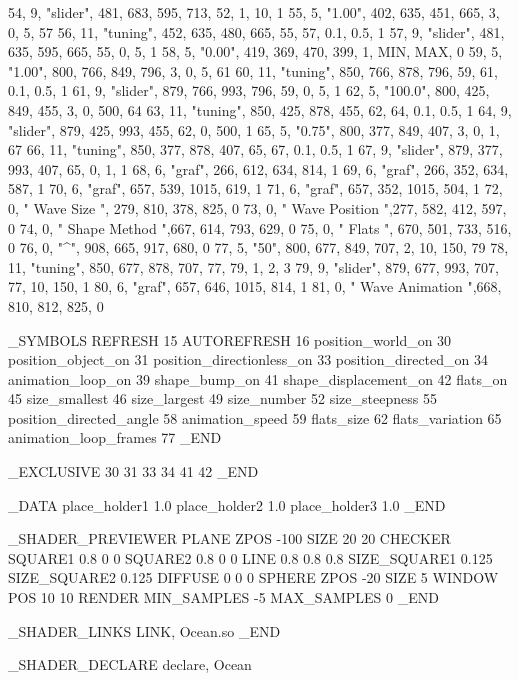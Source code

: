    54,	9,	"slider",	481, 683, 595, 713, 52, 1, 10, 1
   55,	5,	"1.00",		402, 635, 451, 665, 3, 0, 5, 57
   56,	11,	"tuning",	452, 635, 480, 665, 55, 57, 0.1, 0.5, 1
   57,	9,	"slider",	481, 635, 595, 665, 55, 0, 5, 1
   58,	5,	"0.00",		419, 369, 470, 399, 1, MIN, MAX, 0
   59,	5,	"1.00",		800, 766, 849, 796, 3, 0, 5, 61
   60,	11,	"tuning",	850, 766, 878, 796, 59, 61, 0.1, 0.5, 1
   61,	9,	"slider",	879, 766, 993, 796, 59, 0, 5, 1
   62,	5,	"100.0",	800, 425, 849, 455, 3, 0, 500, 64
   63,	11,	"tuning",	850, 425, 878, 455, 62, 64, 0.1, 0.5, 1
   64,	9,	"slider",	879, 425, 993, 455, 62, 0, 500, 1
   65,	5,	"0.75",		800, 377, 849, 407, 3, 0, 1, 67
   66,	11,	"tuning",	850, 377, 878, 407, 65, 67, 0.1, 0.5, 1
   67,	9,	"slider",	879, 377, 993, 407, 65, 0, 1, 1
   68,	6,	"graf",		266, 612, 634, 814, 1
   69,	6,	"graf",		266, 352, 634, 587, 1
   70,	6,	"graf",		657, 539, 1015, 619, 1
   71,	6,	"graf",		657, 352, 1015, 504, 1
   72,	0,	" Wave Size ",	279, 810, 378, 825, 0
   73,	0,	" Wave Position ",277, 582, 412, 597, 0
   74,	0,	" Shape Method ",667, 614, 793, 629, 0
   75,	0,	" Flats ",	670, 501, 733, 516, 0
   76,	0,	"^",		908, 665, 917, 680, 0
   77,	5,	"50",		800, 677, 849, 707, 2, 10, 150, 79
   78,	11,	"tuning",	850, 677, 878, 707, 77, 79, 1, 2, 3
   79,	9,	"slider",	879, 677, 993, 707, 77, 10, 150, 1
   80,	6,	"graf",		657, 646, 1015, 814, 1
   81,	0,	" Wave Animation ",668, 810, 812, 825, 0

_SYMBOLS
  REFRESH    15
  AUTOREFRESH    16
  position_world_on    30
  position_object_on    31
  position_directionless_on    33
  position_directed_on    34
  animation_loop_on    39
  shape_bump_on    41
  shape_displacement_on    42
  flats_on    45
  size_smallest    46
  size_largest    49
  size_number    52
  size_steepness    55
  position_directed_angle    58
  animation_speed    59
  flats_size    62
  flats_variation    65
  animation_loop_frames    77
_END

_EXCLUSIVE
30 31
33 34
41 42
_END



_DATA
place_holder1 1.0
place_holder2 1.0
place_holder3 1.0
_END


_SHADER_PREVIEWER
PLANE
  ZPOS -100
  SIZE 20 20
  CHECKER
    SQUARE1 0.8 0 0
    SQUARE2 0.8 0 0
    LINE 0.8 0.8 0.8
    SIZE_SQUARE1 0.125
    SIZE_SQUARE2 0.125
    DIFFUSE 0 0 0
SPHERE
  ZPOS -20
  SIZE 5
WINDOW
  POS 10 10
RENDER
  MIN_SAMPLES -5
  MAX_SAMPLES 0
_END


_SHADER_LINKS
LINK, Ocean.so
_END


_SHADER_DECLARE
declare, Ocean

